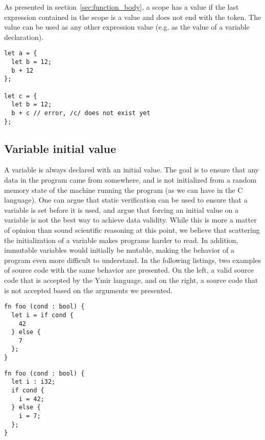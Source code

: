 As presented in section~\ref{sec:function_body}, a scope has a value if the last
expression contained in the scope is a value and does not end with the
\token{;} token. The value can be used as any other expression value (e.g. as
the value of a variable declaration).

\begin{lstlisting}[style=coloredverbatim]
let a = {
  let b = 12;
  b + 12
};

let c = {
  let b = 12;
  b + c // error, /c/ does not exist yet
};
\end{lstlisting}

\subsection{Variable initial value}

A variable is always declared with an initial value. The goal is to ensure that
any data in the program came from somewhere, and is not initialized from a
random memory state of the machine running the program (as we can have in the C
language). One can argue that static verification can be used to ensure that a
variable is set before it is used, and argue that forcing an initial value on a
variable is not the best way to achieve data validity. While this is more a
matter of opinion than sound scientific reasoning at this point, we believe that
scattering the initialization of a variable makes programs harder to read. In
addition, immutable variables would initially be mutable, making the behavior of
a program even more difficult to understand. In the following listings, two
examples of source code with the same behavior are presented. On the left, a
valid source code that is accepted by the Ymir language, and on the right, a
source code that is not accepted based on the arguments we presented.



\hspace{-15pt}%
\begin{minipage}[t][][t]{0.47\linewidth}
  \begin{lstlisting}[style=coloredverbatim, caption=Valid]
fn foo (cond : bool) {
  let i = if cond {
    42
  } else {
    7
  };
}
  \end{lstlisting}
\end{minipage}\hspace{10pt}%
\begin{minipage}[t][][t]{0.47\linewidth}
  \begin{lstlisting}[style=coloredverbatim, caption=Invalid]
fn foo (cond : bool) {
  let i : i32;
  if cond {
    i = 42;
  } else {
    i = 7;
  };
}
  \end{lstlisting}
\end{minipage}


